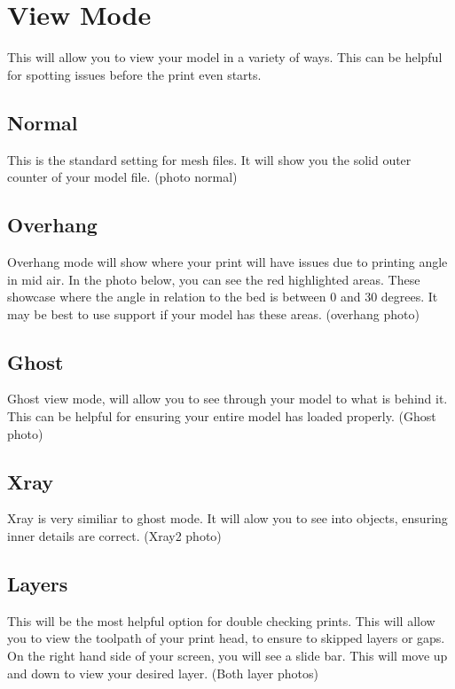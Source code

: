 \section{View Mode}

This will allow you to view your model in a variety of ways. This can be helpful for spotting issues before the print even starts. 

\subsection{Normal}

This is the standard setting for mesh files. It will show you the solid outer counter of your model file. (photo normal)

\subsection{Overhang}

Overhang mode will show where your print will have issues due to printing angle in mid air. In the photo below, you can see the red highlighted areas. These showcase where the angle in relation to the bed is between 0 and 30 degrees. It may be best to use support if your model has these areas. (overhang photo)

\subsection{Ghost}

Ghost view mode, will allow you to see through your model to what is behind it. This can be helpful for ensuring your entire model has loaded properly. (Ghost photo)

\subsection{Xray}

Xray is very similiar to ghost mode. It will alow you to see into objects, ensuring inner details are correct. (Xray2 photo)

\subsection{Layers}

This will be the most helpful option for double checking prints. This will allow you to view the toolpath of your print head, to ensure to skipped layers or gaps. On the right hand side of your screen, you will see a slide bar. This will move up and down to view your desired layer. (Both layer photos)

